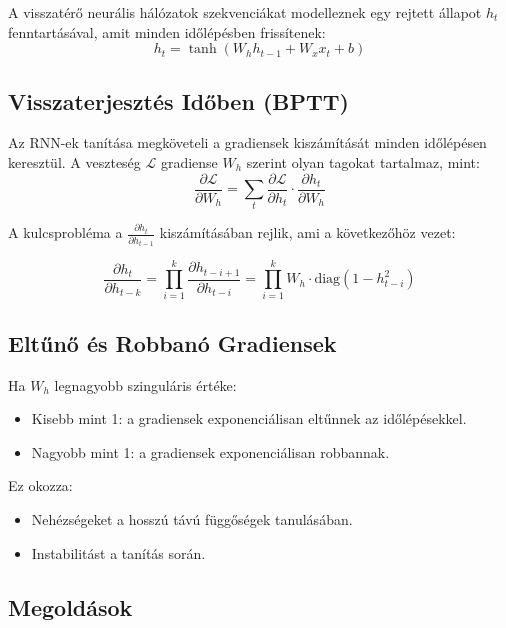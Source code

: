 A visszatérő neurális hálózatok szekvenciákat modelleznek egy rejtett állapot $h_t$ fenntartásával, amit minden időlépésben frissítenek:
\begin{equation}
h_t = \tanh(W_h h_{t-1} + W_x x_t + b)
\end{equation}

\subsection{Visszaterjesztés Időben (BPTT)}

Az RNN-ek tanítása megköveteli a gradiensek kiszámítását minden időlépésen keresztül. A veszteség $\mathcal{L}$ gradiense $W_h$ szerint olyan tagokat tartalmaz, mint:
\begin{equation}
\frac{\partial \mathcal{L}}{\partial W_h} = \sum_{t} \frac{\partial \mathcal{L}}{\partial h_t} \cdot \frac{\partial h_t}{\partial W_h}
\end{equation}

A kulcsprobléma a $\frac{\partial h_t}{\partial h_{t-1}}$ kiszámításában rejlik, ami a következőhöz vezet:

\begin{equation}
\frac{\partial h_t}{\partial h_{t-k}} = \prod_{i=1}^{k} \frac{\partial h_{t-i+1}}{\partial h_{t-i}} = \prod_{i=1}^{k} W_h \cdot \text{diag}(1 - h_{t-i}^2)
\end{equation}

\subsection{Eltűnő és Robbanó Gradiensek}

Ha $W_h$ legnagyobb szinguláris értéke:
\begin{itemize}
    \item Kisebb mint 1: a gradiensek exponenciálisan eltűnnek az időlépésekkel.
    \item Nagyobb mint 1: a gradiensek exponenciálisan robbannak.
\end{itemize}

Ez okozza:
\begin{itemize}
    \item Nehézségeket a hosszú távú függőségek tanulásában.
    \item Instabilitást a tanítás során.
\end{itemize}

\subsection{Megoldások}

